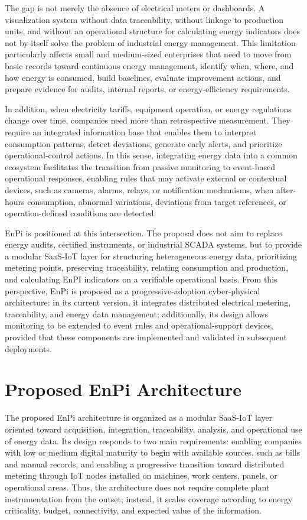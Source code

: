 \documentclass{ieeeaccess}
\begin{document}
The gap is not merely the absence of electrical meters or dashboards. A visualization system without data traceability, without linkage to production units, and without an operational structure for calculating energy indicators does not by itself solve the problem of industrial energy management. This limitation particularly affects small and medium-sized enterprises that need to move from basic records toward continuous energy management, identify when, where, and how energy is consumed, build baselines, evaluate improvement actions, and prepare evidence for audits, internal reports, or energy-efficiency requirements.

In addition, when electricity tariffs, equipment operation, or energy regulations change over time, companies need more than retrospective measurement. They require an integrated information base that enables them to interpret consumption patterns, detect deviations, generate early alerts, and prioritize operational-control actions. In this sense, integrating energy data into a common ecosystem facilitates the transition from passive monitoring to event-based operational responses, enabling rules that may activate external or contextual devices, such as cameras, alarms, relays, or notification mechanisms, when after-hours consumption, abnormal variations, deviations from target references, or operation-defined conditions are detected.

EnPi is positioned at this intersection. The proposal does not aim to replace energy audits, certified instruments, or industrial SCADA systems, but to provide a modular SaaS-IoT layer for structuring heterogeneous energy data, prioritizing metering points, preserving traceability, relating consumption and production, and calculating EnPI indicators on a verifiable operational basis. From this perspective, EnPi is proposed as a progressive-adoption cyber-physical architecture: in its current version, it integrates distributed electrical metering, traceability, and energy data management; additionally, its design allows monitoring to be extended to event rules and operational-support devices, provided that these components are implemented and validated in subsequent deployments.

\section{Proposed EnPi Architecture}
\label{sec:proposed-architecture}

The proposed EnPi architecture is organized as a modular SaaS-IoT layer oriented toward acquisition, integration, traceability, analysis, and operational use of energy data. Its design responds to two main requirements: enabling companies with low or medium digital maturity to begin with available sources, such as bills and manual records, and enabling a progressive transition toward distributed metering through IoT nodes installed on machines, work centers, panels, or operational areas. Thus, the architecture does not require complete plant instrumentation from the outset; instead, it scales coverage according to energy criticality, budget, connectivity, and expected value of the information.
\end{document}
